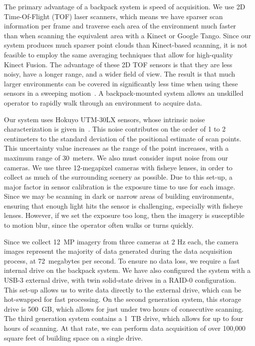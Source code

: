 \documentclass[12pt,onecolumn,oneside]{book}
\begin{document}
The primary advantage of a backpack system is speed of acquisition.  We use 2D Time-Of-Flight (TOF) laser scanners, which means we have sparser scan information per frame and traverse each area of the environment much faster than when scanning the equivalent area with a Kinect or Google Tango.  Since our system produces much sparser point clouds than Kinect-based scanning, it is not feasible to employ the same averaging techniques that allow for high-quality Kinect Fusion.  The advantage of these 2D TOF sensors is that they are less noisy, have a longer range, and a wider field of view.  The result is that much larger environments can be covered in significantly less time when using these sensors in a sweeping motion~\cite{Sweep}.  A backpack-mounted system allows an unskilled operator to rapidly walk through an environment to acquire data.

Our system uses Hokuyo UTM-30LX sensors, whose intrinsic noise characterization is given in~\cite{Pomerleau12,Wong11}.  This noise contributes on the order of 1 to 2 centimeters to the standard deviation of the positional estimate of scan points.  This uncertainty value increases as the range of the point increases, with a maximum range of $30$~meters.  We also must consider input noise from our cameras.  We use three 12-megapixel cameras with fisheye lenses, in order to collect as much of the surrounding scenery as possible.  Due to this set-up, a major factor in sensor calibration is the exposure time to use for each image.  Since we may be scanning in dark or narrow areas of building environments, ensuring that enough light hits the sensor is challenging, especially with fisheye lenses.  However, if we set the exposure too long, then the imagery is susceptible to motion blur, since the operator often walks or turns quickly.

Since we collect 12~MP imagery from three cameras at 2 Hz each, the camera images represent the majority of data generated during the data acquisition process, at 72~megabytes per second.  To ensure no data loss, we require a fast internal drive on the backpack system.  We have also configured the system with a USB-3 external drive, with twin solid-state drives in a RAID-0 configuration.  This set-up allows us to write data directly to the external drive, which can be hot-swapped for fast processing.  On the second generation system, this storage drive is 500~GB, which allows for just under two hours of consecutive scanning.  The third generation system contains a 1~TB drive, which allows for up to four hours of scanning.  At that rate, we can perform data acquisition of over 100,000 square feet of building space on a single drive.
\end{document}
